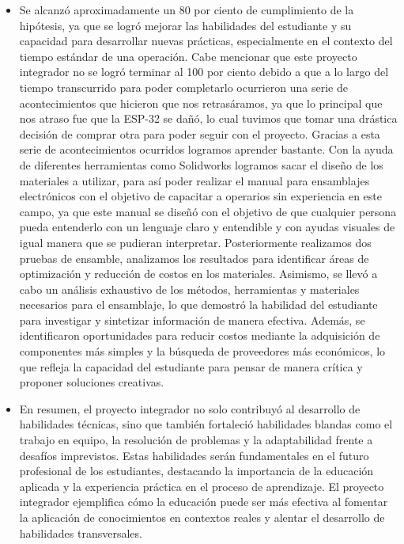     \begin{itemize}
        \item Se alcanzó aproximadamente un 80 por ciento de cumplimiento de la hipótesis, ya que se logró mejorar las habilidades del estudiante y su capacidad para desarrollar nuevas prácticas, especialmente en el contexto del tiempo estándar de una operación. Cabe mencionar que este proyecto integrador no se logró terminar al 100 por ciento debido a que a lo largo del tiempo transcurrido para poder completarlo ocurrieron una serie de acontecimientos que hicieron que nos retrasáramos, ya que lo principal que nos atraso fue que la ESP-32 se dañó, lo cual tuvimos que tomar una drástica decisión de comprar otra para poder seguir con el proyecto. Gracias a esta serie de acontecimientos ocurridos logramos aprender bastante.
     Con la ayuda de diferentes herramientas como Solidworks logramos sacar el diseño de los materiales a utilizar, para así poder realizar el manual para ensamblajes electrónicos con el objetivo de capacitar a operarios sin experiencia en este campo, ya que este manual se diseñó con el objetivo de que cualquier persona pueda entenderlo con un lenguaje claro y entendible y con ayudas visuales de igual manera que se pudieran interpretar. Posteriormente realizamos dos pruebas de ensamble, analizamos los resultados para identificar áreas de optimización y reducción de costos en los materiales. Asimismo, se llevó a cabo un análisis exhaustivo de los métodos, herramientas y materiales necesarios para el ensamblaje, lo que demostró la habilidad del estudiante para investigar y sintetizar información de manera efectiva. Además, se identificaron oportunidades para reducir costos mediante la adquisición de componentes más simples y la búsqueda de proveedores más económicos, lo que refleja la capacidad del estudiante para pensar de manera crítica y proponer soluciones creativas.
    \end{itemize}
    \begin{itemize}
        \item En resumen, el proyecto integrador no solo contribuyó al desarrollo de habilidades técnicas, sino que también fortaleció habilidades blandas como el trabajo en equipo, la resolución de problemas y la adaptabilidad frente a desafíos imprevistos. Estas habilidades serán fundamentales en el futuro profesional de los estudiantes, destacando la importancia de la educación aplicada y la experiencia práctica en el proceso de aprendizaje. El proyecto integrador ejemplifica cómo la educación puede ser más efectiva al fomentar la aplicación de conocimientos en contextos reales y alentar el desarrollo de habilidades transversales.
    \end{itemize}
    
